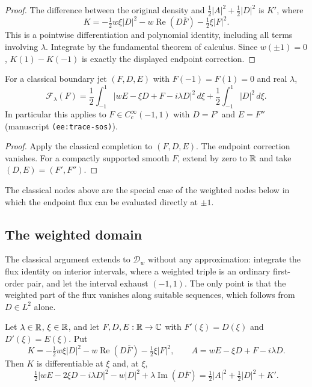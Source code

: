 \begin{proof}
\leanok
The difference between the original density and
$\tfrac12|A|^2+\tfrac12|D|^2$ is $K'$, where
\[
  K=-\tfrac12 w\xi|D|^2-w\operatorname{Re}(D\bar F)-\tfrac12\xi|F|^2.
\]
This is a pointwise differentiation and polynomial identity, including all
terms involving $\lambda$. Integrate by the fundamental theorem of calculus.
Since $w(\pm1)=0$, $K(1)-K(-1)$ is exactly the displayed endpoint correction.
\end{proof}

\begin{lemma}
\label{lem:trace-sos-smooth}
\leanok
For a classical boundary jet $(F,D,E)$ with $F(-1)=F(1)=0$ and real $\lambda$,
\[
  \mathcal F_\lambda(F)=\frac12\int_{-1}^1|wE-\xi D+F-i\lambda D|^2\,d\xi
  +\frac12\int_{-1}^1|D|^2\,d\xi.
\]
In particular this applies to $F\in C_c^\infty(-1,1)$ with $D=F'$ and $E=F''$
(manuscript \texttt{(ee:trace-sos)}).
\end{lemma}

\begin{proof}
\leanok
Apply the classical completion to $(F,D,E)$. The endpoint correction vanishes.
For a compactly supported smooth $F$, extend by zero to $\mathbb{R}$ and take
$(D,E)=(F',F'')$.
\end{proof}

\begin{remark}
The classical nodes above are the special case of the weighted nodes below
in which the endpoint flux can be evaluated directly at $\pm1$.
\end{remark}

\subsection{The weighted domain}

The classical argument extends to $\mathcal D_w$ without any approximation:
integrate the flux identity on interior intervals, where a weighted triple
is an ordinary first-order pair, and let the interval exhaust $(-1,1)$. The
only point is that the weighted part of the flux vanishes along suitable
sequences, which follows from $D\in L^2$ alone.

\begin{lemma}
\label{lem:boundary-flux}
\leanok
Let $\lambda\in\mathbb{R}$, $\xi\in\mathbb{R}$, and let $F,D,E:\mathbb{R}\to\mathbb{C}$ with
$F'(\xi)=D(\xi)$ and $D'(\xi)=E(\xi)$. Put
\[
  K=-\tfrac12 w\xi|D|^2-w\operatorname{Re}(D\bar F)-\tfrac12\xi|F|^2,\qquad
  A=wE-\xi D+F-i\lambda D.
\]
Then $K$ is differentiable at $\xi$ and, at $\xi$,
\[
  \tfrac12|wE-2\xi D-i\lambda D|^2-w|D|^2+\lambda\operatorname{Im}(D\bar F)
  =\tfrac12|A|^2+\tfrac12|D|^2+K'.
\]
\end{lemma}

